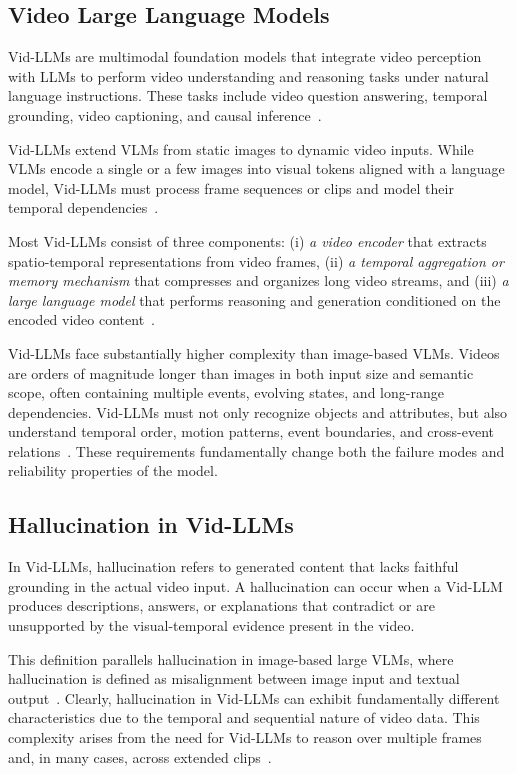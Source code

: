 \documentclass[10pt]{article} %
\begin{document}
\subsection{Video Large Language Models}\label{subsec:vid-llms}
Vid-LLMs are multimodal foundation models that integrate video perception with LLMs to perform video understanding and reasoning tasks under natural language instructions. These tasks include video question answering, temporal grounding, video captioning, and causal inference~\citep{tang2025video}.

Vid-LLMs extend VLMs from static images to dynamic video inputs. While VLMs encode a single or a few images into visual tokens aligned with a language model, Vid-LLMs must process frame sequences or clips and model their temporal dependencies~\citep{liu2024survey}.

Most Vid-LLMs consist of three components: (i) \emph{a video encoder} that extracts spatio-temporal representations from video frames, (ii) \emph{a temporal aggregation or memory mechanism} that compresses and organizes long video streams, and (iii) \emph{a large language model} that performs reasoning and generation conditioned on the encoded video content~\citep{nguyen2024video}.

Vid-LLMs face substantially higher complexity than image-based VLMs. Videos are orders of magnitude longer than images in both input size and semantic scope, often containing multiple events, evolving states, and long-range dependencies. Vid-LLMs must not only recognize objects and attributes, but also understand temporal order, motion patterns, event boundaries, and cross-event relations~\citep{sahoo2024comprehensive}. These requirements fundamentally change both the failure modes and reliability properties of the model.

\subsection{Hallucination in Vid-LLMs}\label{subsec:vid-llms-hallucination}
In Vid-LLMs, hallucination refers to generated content that lacks faithful grounding in the actual video input. A hallucination can occur when a Vid-LLM produces descriptions, answers, or explanations that contradict or are unsupported by the visual-temporal evidence present in the video.

This definition parallels hallucination in image-based large VLMs, where hallucination is defined as misalignment between image input and textual output~\citep{liu2024survey}. Clearly, hallucination in Vid-LLMs can exhibit fundamentally different characteristics due to the temporal and sequential nature of video data. This complexity arises from the need for Vid-LLMs to reason over multiple frames and, in many cases, across extended clips~\citep{tang2025video}.
\end{document}
